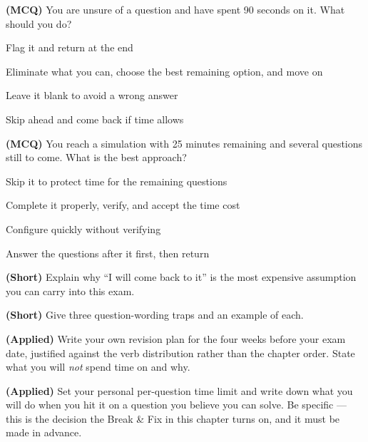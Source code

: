 \begin{reviewq}
  \item \textbf{(MCQ)} You are unsure of a question and have spent 90 seconds on
        it. What should you do?
        \begin{tight}
          \item[(a)] Flag it and return at the end
          \item[(b)] Eliminate what you can, choose the best remaining option, and
                     move on
          \item[(c)] Leave it blank to avoid a wrong answer
          \item[(d)] Skip ahead and come back if time allows
        \end{tight}
  \item \textbf{(MCQ)} You reach a simulation with 25 minutes remaining and
        several questions still to come. What is the best approach?
        \begin{tight}
          \item[(a)] Skip it to protect time for the remaining questions
          \item[(b)] Complete it properly, verify, and accept the time cost
          \item[(c)] Configure quickly without verifying
          \item[(d)] Answer the questions after it first, then return
        \end{tight}
  \item \textbf{(Short)} Explain why ``I will come back to it'' is the most
        expensive assumption you can carry into this exam.
  \item \textbf{(Short)} Give three question-wording traps and an example of each.
  \item \textbf{(Applied)} Write your own revision plan for the four weeks before
        your exam date, justified against the verb distribution rather than the
        chapter order. State what you will \emph{not} spend time on and why.
  \item \textbf{(Applied)} Set your personal per-question time limit and write
        down what you will do when you hit it on a question you believe you can
        solve. Be specific --- this is the decision the Break \& Fix in this
        chapter turns on, and it must be made in advance.
\end{reviewq}
